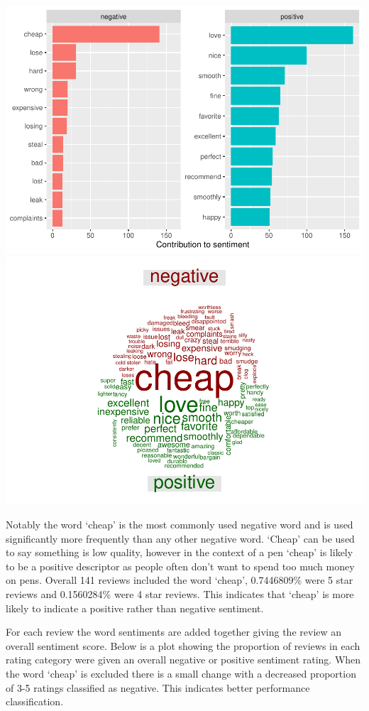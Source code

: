 \documentclass[
  11pt,
]{article}
\begin{document}
\includegraphics{Assignment-STAT702_files/figure-latex/3b word sentiment-1.pdf}
\includegraphics{Assignment-STAT702_files/figure-latex/3b word sentiment-2.pdf}

Notably the word `cheap' is the most commonly used negative word and is
used significantly more frequently than any other negative word. `Cheap'
can be used to say something is low quality, however in the context of a
pen `cheap' is likely to be a positive descriptor as people often don't
want to spend too much money on pens. Overall 141 reviews included the
word `cheap', 0.7446809\% were 5 star reviews and 0.1560284\% were 4
star reviews. This indicates that `cheap' is more likely to indicate a
positive rather than negative sentiment.

For each review the word sentiments are added together giving the review
an overall sentiment score. Below is a plot showing the proportion of
reviews in each rating category were given an overall negative or
positive sentiment rating. When the word `cheap' is excluded there is a
small change with a decreased proportion of 3-5 ratings classified as
negative. This indicates better performance classification.
\end{document}
